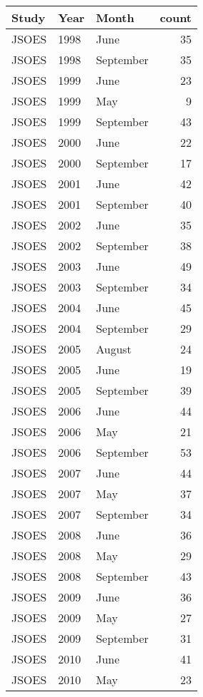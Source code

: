 \documentclass[
]{article}
\begin{document}
\begin{table}
\centering
\begin{tabular}[t]{l|l|l|r}
\hline
Study & Year & Month & count\\
\hline
JSOES & 1998 & June & 35\\
\hline
JSOES & 1998 & September & 35\\
\hline
JSOES & 1999 & June & 23\\
\hline
JSOES & 1999 & May & 9\\
\hline
JSOES & 1999 & September & 43\\
\hline
JSOES & 2000 & June & 22\\
\hline
JSOES & 2000 & September & 17\\
\hline
JSOES & 2001 & June & 42\\
\hline
JSOES & 2001 & September & 40\\
\hline
JSOES & 2002 & June & 35\\
\hline
JSOES & 2002 & September & 38\\
\hline
JSOES & 2003 & June & 49\\
\hline
JSOES & 2003 & September & 34\\
\hline
JSOES & 2004 & June & 45\\
\hline
JSOES & 2004 & September & 29\\
\hline
JSOES & 2005 & August & 24\\
\hline
JSOES & 2005 & June & 19\\
\hline
JSOES & 2005 & September & 39\\
\hline
JSOES & 2006 & June & 44\\
\hline
JSOES & 2006 & May & 21\\
\hline
JSOES & 2006 & September & 53\\
\hline
JSOES & 2007 & June & 44\\
\hline
JSOES & 2007 & May & 37\\
\hline
JSOES & 2007 & September & 34\\
\hline
JSOES & 2008 & June & 36\\
\hline
JSOES & 2008 & May & 29\\
\hline
JSOES & 2008 & September & 43\\
\hline
JSOES & 2009 & June & 36\\
\hline
JSOES & 2009 & May & 27\\
\hline
JSOES & 2009 & September & 31\\
\hline
JSOES & 2010 & June & 41\\
\hline
JSOES & 2010 & May & 23\\

\end{tabular}
\end{table}
\end{document}
